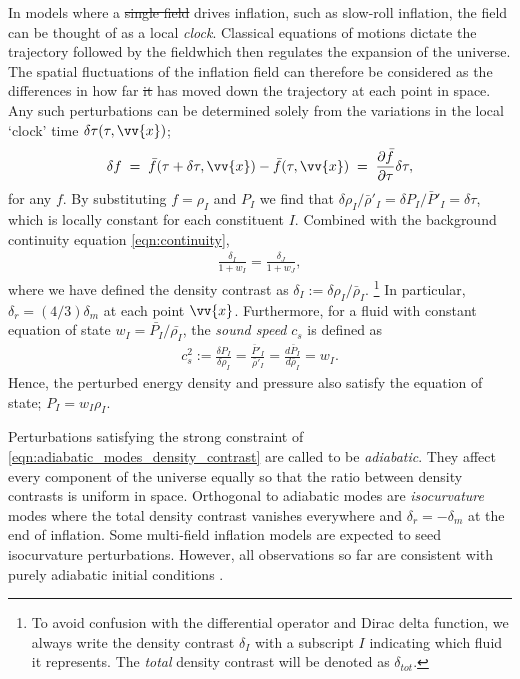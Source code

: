 \documentclass[a4paper,12pt,times,custombib,print,index]{Classes/PhDThesisPSnPDF} %
\providecommand{\DIFadd}[1]{{\protect\color{blue}\uwave{#1}}} %
\providecommand{\DIFdel}[1]{{\protect\color{red}\sout{#1}}}                      %
\providecommand{\DIFaddbegin}{} %
\providecommand{\DIFaddend}{} %
\providecommand{\DIFdelbegin}{} %
\providecommand{\DIFdelend}{} %
\newcommand{\DIFscaledelfig}{0.5}
\newlength{\DIFdelgraphicswidth} %
\newlength{\DIFdelgraphicsheight} %
\newcommand{\DIFaddincludegraphics}[2][]{{\color{blue}\fbox{\DIFOincludegraphics[#1]{#2}}}} %
\newcommand{\DIFdelincludegraphics}[2][]{%
\sbox{\DIFdelgraphicsbox}{\DIFOincludegraphics[#1]{#2}}%
\settoboxwidth{\DIFdelgraphicswidth}{\DIFdelgraphicsbox} %
\settoboxtotalheight{\DIFdelgraphicsheight}{\DIFdelgraphicsbox} %
\scalebox{\DIFscaledelfig}{%
\parbox[b]{\DIFdelgraphicswidth}{\usebox{\DIFdelgraphicsbox}\\[-\baselineskip] \rule{\DIFdelgraphicswidth}{0em}}\llap{\resizebox{\DIFdelgraphicswidth}{\DIFdelgraphicsheight}{%
\setlength{\unitlength}{\DIFdelgraphicswidth}%
\begin{picture}(1,1)%
\thicklines\linethickness{2pt} %
{\color[rgb]{1,0,0}\put(0,0){\framebox(1,1){}}}%
{\color[rgb]{1,0,0}\put(0,0){\line( 1,1){1}}}%
{\color[rgb]{1,0,0}\put(0,1){\line(1,-1){1}}}%
\end{picture}%
}\hspace*{3pt}}} %
} %
\DeclareRobustCommand{\DIFaddbegin}{\DIFOaddbegin \let\includegraphics\DIFaddincludegraphics} %
\DeclareRobustCommand{\DIFaddend}{\DIFOaddend \let\includegraphics\DIFOincludegraphics} %
\DeclareRobustCommand{\DIFdelbegin}{\DIFOdelbegin \let\includegraphics\DIFdelincludegraphics} %
\DeclareRobustCommand{\DIFdelend}{\DIFOaddend \let\includegraphics\DIFOincludegraphics} %
\begin{document}
In models where a \DIFdelbegin \DIFdel{single field }\DIFdelend \DIFaddbegin \DIFadd{single-field }\DIFaddend drives inflation, such as slow-roll inflation, the field can be thought of as a local \textit{clock}. Classical equations of motions dictate the trajectory followed by the field\DIFaddbegin \DIFadd{, }\DIFaddend which then regulates the expansion of the universe. The spatial fluctuations of the inflation field can therefore be considered as the differences in how far \DIFdelbegin \DIFdel{it }\DIFdelend \DIFaddbegin \DIFadd{the field }\DIFaddend has moved down the trajectory at each point in space. Any such perturbations can be determined solely from the variations in the local `clock' time $\delta\tau(\tau,\vv{x})$;
\begin{align}
	\delta f \;=\; \bar{f}(\tau + \delta\tau, \vv{x}) - \bar{f}(\tau,\vv{x}) \;=\; \frac{\partial\bar{f}}{\partial\tau} \delta\tau, \label{eqn:local_clock_time_fluctuation}
\end{align}
for any $f$. By substituting $f=\rho_I$ and $P_I$ we find that $\delta\rho_I/\bar{\rho}'_I = \delta P_I / \bar{P}'_I = \delta\tau$, which is locally constant for each constituent $I$. Combined with the background continuity equation \eqref{eqn:continuity},
\begin{align}
	\frac{\delta_I}{1+w_I} = \frac{\delta_J}{1+w_J}, \label{eqn:adiabatic_modes_density_contrast}
\end{align}
where we have defined the density contrast as $\delta_I := \delta\rho_I / \bar{\rho}_I$. \footnote{To avoid confusion with the differential operator and Dirac delta function, we always write the density contrast $\delta_I$ with a subscript $I$ indicating which fluid it represents. The \textit{total} density contrast will be denoted as $\delta_{tot}$.} In particular, $\delta_r = (4/3) \delta_m$ at each point $\vv{x}$. Furthermore, for a fluid with \DIFaddbegin \DIFadd{a }\DIFaddend constant equation of state $w_I = \bar{P_I} / \bar{\rho_I}$, the \textit{sound speed} $c_s$ is defined as
\begin{align}
	c_s^2 := \frac{\delta P_I}{\delta\rho_I} = \frac{\bar{P}'_I}{\bar{\rho}'_I} = \frac{d\bar{P}_I}{d\bar{\rho}_I} = w_I. \label{eqn:adiabatic_modes_sound_speed}
\end{align}
Hence, the perturbed energy density and pressure also satisfy the equation of state; $P_I = w_I \rho_I$.

Perturbations satisfying the strong constraint of \eqref{eqn:adiabatic_modes_density_contrast} are called to be \textit{adiabatic}. They affect every component of the universe equally so that the ratio between density contrasts is uniform in space. Orthogonal to adiabatic modes are \textit{isocurvature} modes where the total density contrast vanishes everywhere and $\delta_r = -\delta_m$ at the end of inflation. Some multi-field inflation models are expected to seed isocurvature perturbations. However, all observations so far are consistent with purely adiabatic initial conditions \cite{Kogut2003wmapAdiabatic, PlanckCollaboration2018inflation}.
\end{document}
